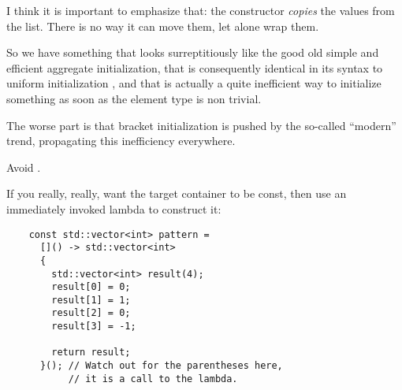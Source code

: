 \bigskip

I think it is important to emphasize that: the constructor
\emph{copies} the values from the list. There is no way it can move
them, let alone wrap them.

\bigskip

So we have something that looks surreptitiously like the good old
simple and efficient aggregate initialization, that is consequently
identical in its syntax to uniform initialization
, and that is actually a quite
inefficient way to initialize something as soon as the element type is
non trivial.

The worse part is that bracket initialization is pushed by the
so-called ``modern'' \cpp{} trend, propagating this inefficiency
everywhere.

\begin{guideline}
  Avoid .

  If you really, really, want the target container to be const, then
  use an immediately invoked lambda to construct it:

  \begin{lstlisting}
    const std::vector<int> pattern =
      []() -> std::vector<int>
      {
        std::vector<int> result(4);
        result[0] = 0;
        result[1] = 1;
        result[2] = 0;
        result[3] = -1;

        return result;
      }(); // Watch out for the parentheses here,
           // it is a call to the lambda.
  \end{lstlisting}
\end{guideline}

